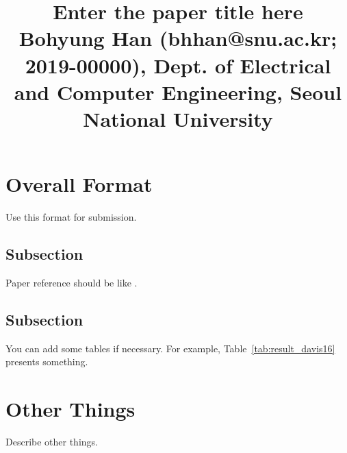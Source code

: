 \documentclass[10pt,twocolumn,letterpaper]{article}
\begin{document}
\title{Enter the paper title here \\ {\rm {\normalsize Bohyung Han (bhhan@snu.ac.kr; 2019-00000), Dept. of Electrical and Computer Engineering, Seoul National University}}}   %

\maketitle
\thispagestyle{empty}


\section{Overall Format}
Use this format for submission.


\subsection{Subsection}
Paper reference should be like \cite{wug2018fast}.

\subsection{Subsection}
You can add some tables if necessary.
For example, Table~\ref{tab:result_davis16} presents something.
%
\begin{table}[t]
\caption{Comparison.}
\begin{center}
\end{center}
\label{tab:result_davis16}
\end{table}
%
 

\section{Other Things}
Describe other things.


{\small


}
\end{document}

